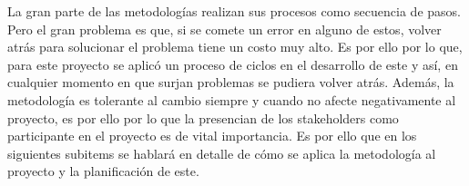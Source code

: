 La gran parte de las metodologías realizan sus procesos como secuencia de pasos. Pero el gran problema es que, si se comete un error en alguno de estos, volver atrás para solucionar el problema tiene un costo muy alto. Es por ello por lo que, para este proyecto se aplicó un proceso de ciclos en el desarrollo de este y así, en cualquier momento en que surjan problemas se pudiera volver atrás. Además, la metodología es tolerante al cambio siempre y cuando no afecte negativamente al proyecto, es por ello por lo que la presencian de los stakeholders como participante en el proyecto es de vital importancia. Es por ello que en los siguientes subitems se hablará en detalle de cómo se aplica la metodología al proyecto y la planificación de este.
